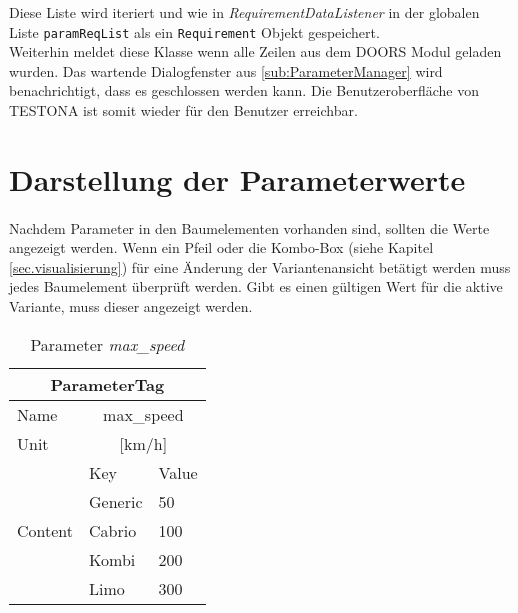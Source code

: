 Diese Liste wird iteriert und wie in \textit{RequirementDataListener} in der globalen Liste \texttt{paramReqList} als ein \texttt{Requirement} Objekt gespeichert.\\

Weiterhin meldet diese Klasse wenn alle Zeilen aus dem DOORS Modul geladen wurden. Das wartende Dialogfenster aus \ref{sub:ParameterManager} wird benachrichtigt, dass es geschlossen werden kann. Die Benutzeroberfläche von TESTONA ist somit wieder für den Benutzer erreichbar.



\newpage
\section{Darstellung der Parameterwerte}\label{sec.LoesungVisualisierung}
\paragraph{}

Nachdem Parameter in den Baumelementen vorhanden sind, sollten die Werte angezeigt werden. Wenn ein Pfeil oder die Kombo-Box (siehe Kapitel \ref{sec.visualisierung}) für eine Änderung der Variantenansicht betätigt werden muss jedes Baumelement überprüft werden. Gibt es einen gültigen Wert für die aktive Variante, muss dieser angezeigt werden.\\

 
\begin{table}[h]
\begin{center}
	\begin{tabular}{|l||ll|}
	 \hline
	 \multicolumn{3}{|c|}{ParameterTag}\\
	 \hline\hline
	 Name		& \multicolumn{2}{|c|}{max\_speed}\\
	 \hline
	 Unit		& \multicolumn{2}{|c|}{[km/h]}\\
	 \hline
	 \multirow{5}{*}{Content}	&Key			&Value\\ \cline{2-3}
	 							&Generic		&50\\
	 							&Cabrio		&100\\
	 							&Kombi		&200\\
	 							&Limo		&300\\
	 \hline
	\end{tabular}
	\caption{Parameter \textit{max\_speed}}
	\label{table:ParameterTagStruktur}
\end{center}
\end{table}


